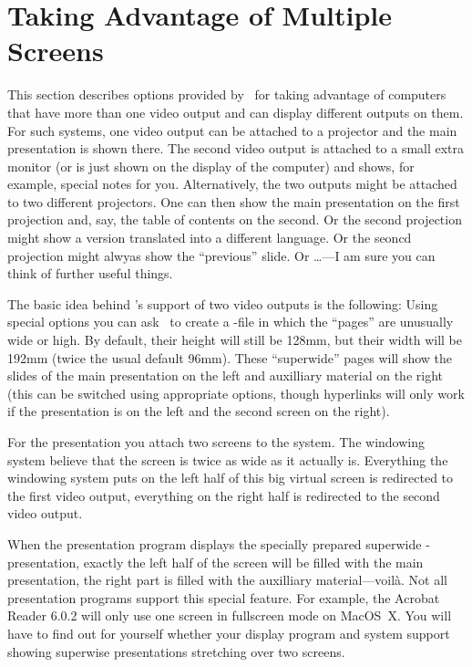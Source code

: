 %
%
%


\section{Taking Advantage of Multiple Screens}
\label{section-twoscreens}

This section describes options provided by \beamer\ for taking advantage of computers that have more than one video output and can display different outputs on them. For such systems, one video output can be attached to a projector and the main presentation is shown there. The second video output is attached to a small extra monitor (or is just shown on the display of the computer) and shows, for example, special notes for you. Alternatively, the two outputs might be attached to two different projectors. One can then show the main presentation on the first projection and, say, the table of contents on the second. Or the second projection might show a version translated into a different language. Or the seoncd projection might alwyas show the ``previous'' slide. Or \ldots---I am sure you can think of further useful things.

The basic idea behind \beamer's support of two video outputs is the following: Using special options you can ask \beamer\ to create a \pdf-file in which the ``pages'' are unusually wide or high. By default, their height will still be 128mm, but their width will be 192mm (twice the usual default 96mm). These ``superwide'' pages will show the slides of the main presentation on the left and auxilliary material on the right (this can be switched using appropriate options, though hyperlinks will only work if the presentation is on the left and the second screen on the right).

For the presentation you attach two screens to the system. The windowing system believe that the screen is twice as wide as it actually is. Everything the windowing system puts on the left half of this big virtual screen is redirected to the first video output, everything on the right half is redirected to the second video output.

When the presentation program displays the specially prepared superwide \beamer-presentation, exactly the left half of the screen will be filled with the main presentation, the right part is filled with the auxilliary material---voil\`a. Not all presentation programs support this special feature. For example, the Acrobat Reader 6.0.2 will only use one screen in fullscreen mode on MacOS~X. You will have to find out for yourself whether your display program and system support showing superwise presentations stretching over two screens.

